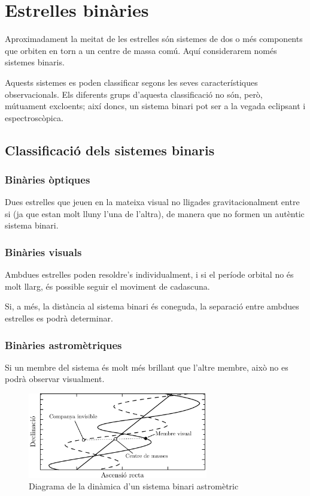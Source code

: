 \section{Estrelles binàries}
Aproximadament la meitat de les estrelles són sistemes de dos o més components que orbiten en torn a un centre de massa comú. Aquí considerarem només sistemes binaris.

Aquests sistemes es poden classificar segons les seves característiques observacionals. Els diferents grups d'aquesta classificació no són, però, mútuament excloents; així doncs, un sistema binari pot ser a la vegada eclipsant i espectroscòpica.

\subsection{Classificació dels sistemes binaris}
\subsubsection*{Binàries òptiques}
Dues estrelles que jeuen en la mateixa visual no lligades gravitacionalment entre si (ja que estan molt lluny l'una de l'altra), de manera que no formen un autèntic sistema binari.

\subsubsection*{Binàries visuals}
Ambdues estrelles poden resoldre's individualment, i si el període orbital no és molt llarg, és possible seguir el moviment de cadascuna.

Si, a més, la distància al sistema binari és coneguda, la separació entre ambdues estrelles es podrà determinar.

\subsubsection*{Binàries astromètriques}
Si un membre del sistema és molt més brillant que l'altre membre, això no es podrà observar visualment.
\begin{figure}[h]
	\centering
	\includegraphics[width=0.7\textwidth]{./images/5-bin-astro}
	\caption{Diagrama de la dinàmica d'un sistema binari astromètric}
	\label{fig:bin-astro}
\end{figure}

